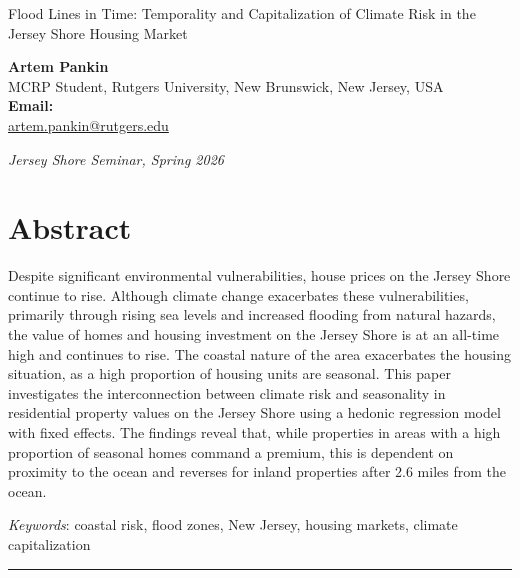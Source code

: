 \documentclass[11pt]{article}
\begin{document}
{\fontsize{22}{26}\selectfont\noindent
Flood Lines in Time: Temporality and Capitalization of Climate Risk
in the Jersey Shore Housing Market}

\vspace{1.5em}

\noindent\textbf{Artem Pankin}\\
MCRP Student, Rutgers University, New Brunswick, New Jersey, USA\\
\textbf{Email:}\\
\href{mailto:artem.pankin@rutgers.edu}{artem.pankin@rutgers.edu}

\vspace{1.2em}
\noindent\textit{Jersey Shore Seminar, Spring 2026}

\vspace{2em}

\section*{Abstract}
\noindent Despite significant environmental vulnerabilities, house prices on the Jersey Shore continue to rise. Although climate change exacerbates these vulnerabilities, primarily through rising sea levels and increased flooding from natural hazards, the value of homes and housing investment on the Jersey Shore is at an all-time high and continues to rise. The coastal nature of the area exacerbates the housing situation, as a high proportion of housing units are seasonal. This paper investigates the interconnection between climate risk and seasonality in residential property values on the Jersey Shore using a hedonic regression model with fixed effects. The findings reveal that, while properties in areas with a high proportion of seasonal homes command a premium, this is dependent on proximity to the ocean and reverses for inland properties after 2.6 miles from the ocean. 

\vspace{0.8em}
\noindent\textit{Keywords}: coastal risk, flood zones, New Jersey, housing markets, climate capitalization

\vspace{1em}
\noindent\rule{\linewidth}{0.4pt}
\vspace{0.5em}

\end{document}
